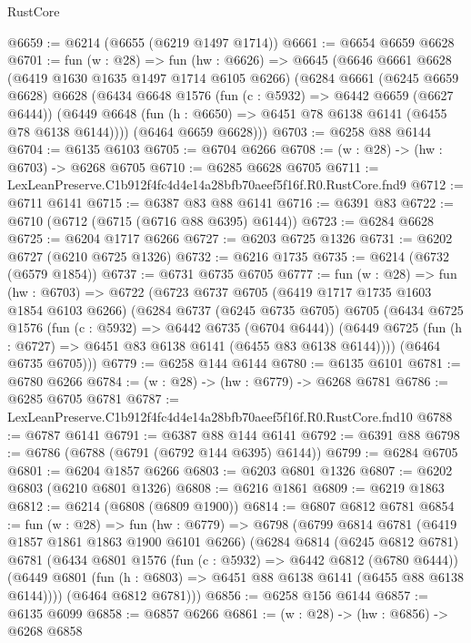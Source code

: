 \begin{lexlean}{RustCore}
\begin{coremodule}
@6659 := @6214 (@6655 (@6219 @1497 @1714))
@6661 := @6654 @6659 @6628
@6701 := fun (w : @28) =>
  fun (hw : @6626) =>
  @6645
    (@6646
      @6661
      @6628
      (@6419 @1630 @1635 @1497 @1714 @6105 @6266)
      (@6284
        @6661
        (@6245 @6659 @6628)
        @6628
        (@6434
          @6648
          @1576
          (fun (c : @5932) => @6442 @6659 (@6627 @6444))
          (@6449 @6648 (fun (h : @6650) => @6451 @78 @6138 @6141 (@6455 @78 @6138 @6144))))
        (@6464 @6659 @6628)))
@6703 := @6258 @88 @6144
@6704 := @6135 @6103
@6705 := @6704 @6266
@6708 := (w : @28) -> (hw : @6703) -> @6268 @6705
@6710 := @6285 @6628 @6705
@6711 := LexLeanPreserve.C1b912f4fc4d4e14a28bfb70aeef5f16f.R0.RustCore.fnd9
@6712 := @6711 @6141
@6715 := @6387 @83 @88 @6141
@6716 := @6391 @83
@6722 := @6710 (@6712 (@6715 (@6716 @88 @6395) @6144))
@6723 := @6284 @6628
@6725 := @6204 @1717 @6266
@6727 := @6203 @6725 @1326
@6731 := @6202 @6727 (@6210 @6725 @1326)
@6732 := @6216 @1735
@6735 := @6214 (@6732 (@6579 @1854))
@6737 := @6731 @6735 @6705
@6777 := fun (w : @28) =>
  fun (hw : @6703) =>
  @6722
    (@6723
      @6737
      @6705
      (@6419 @1717 @1735 @1603 @1854 @6103 @6266)
      (@6284
        @6737
        (@6245 @6735 @6705)
        @6705
        (@6434
          @6725
          @1576
          (fun (c : @5932) => @6442 @6735 (@6704 @6444))
          (@6449 @6725 (fun (h : @6727) => @6451 @83 @6138 @6141 (@6455 @83 @6138 @6144))))
        (@6464 @6735 @6705)))
@6779 := @6258 @144 @6144
@6780 := @6135 @6101
@6781 := @6780 @6266
@6784 := (w : @28) -> (hw : @6779) -> @6268 @6781
@6786 := @6285 @6705 @6781
@6787 := LexLeanPreserve.C1b912f4fc4d4e14a28bfb70aeef5f16f.R0.RustCore.fnd10
@6788 := @6787 @6141
@6791 := @6387 @88 @144 @6141
@6792 := @6391 @88
@6798 := @6786 (@6788 (@6791 (@6792 @144 @6395) @6144))
@6799 := @6284 @6705
@6801 := @6204 @1857 @6266
@6803 := @6203 @6801 @1326
@6807 := @6202 @6803 (@6210 @6801 @1326)
@6808 := @6216 @1861
@6809 := @6219 @1863
@6812 := @6214 (@6808 (@6809 @1900))
@6814 := @6807 @6812 @6781
@6854 := fun (w : @28) =>
  fun (hw : @6779) =>
  @6798
    (@6799
      @6814
      @6781
      (@6419 @1857 @1861 @1863 @1900 @6101 @6266)
      (@6284
        @6814
        (@6245 @6812 @6781)
        @6781
        (@6434
          @6801
          @1576
          (fun (c : @5932) => @6442 @6812 (@6780 @6444))
          (@6449 @6801 (fun (h : @6803) => @6451 @88 @6138 @6141 (@6455 @88 @6138 @6144))))
        (@6464 @6812 @6781)))
@6856 := @6258 @156 @6144
@6857 := @6135 @6099
@6858 := @6857 @6266
@6861 := (w : @28) -> (hw : @6856) -> @6268 @6858

\end{coremodule}
\end{lexlean}
